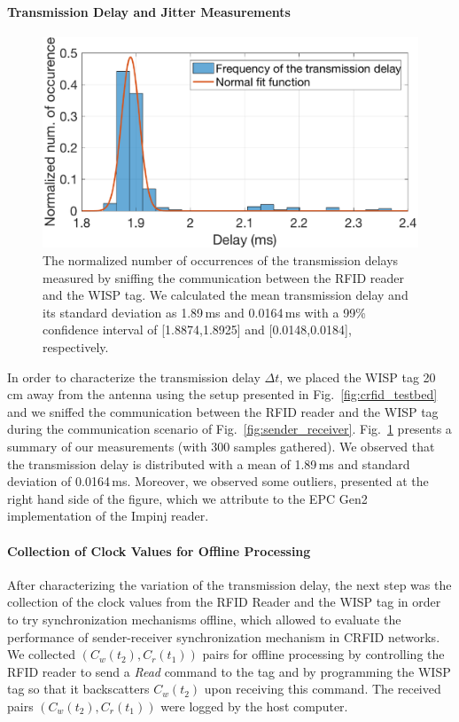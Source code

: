 \documentclass[journal,draftcls,onecolumn,12pt,twoside]{IEEEtranTCOM}
\begin{document}
\paragraph{Transmission Delay and Jitter Measurements}

\begin{figure}
\centering
\includegraphics[scale=0.35]{figures/sender_receiver_uncertainty.eps}
\caption{\label{fig:transmission_delay} The normalized number of occurrences of the transmission delays measured by sniffing the communication between the RFID reader and the WISP tag. We calculated the mean transmission delay and its standard deviation as 1.89\,ms and 0.0164\,ms with a 99\% confidence interval of [1.8874,1.8925] and [0.0148,0.0184], respectively.}
\end{figure}

In order to characterize the transmission delay $\Delta t$, we placed the WISP tag 20 cm away from the antenna using the setup presented in Fig.~\ref{fig:crfid_testbed} and we sniffed the communication between the RFID reader and the WISP tag during the communication scenario of Fig.~\ref{fig:sender_receiver}. Fig.~\ref{fig:transmission_delay} presents a summary of our measurements (with 300 samples gathered). We observed that the transmission delay is distributed with a mean of 1.89\,ms and standard deviation of 0.0164\,ms. Moreover, we observed some outliers, presented at the right hand side of the figure, which we attribute to the EPC Gen2 implementation of the Impinj reader. 

\paragraph{Collection of Clock Values for Offline Processing}

After characterizing the variation of the transmission delay, the next step was the collection of the clock values from the RFID Reader and the WISP tag in order to try synchronization mechanisms offline, which allowed to evaluate the performance of sender-receiver synchronization mechanism in CRFID networks. We collected $(C_w(t_2),C_r(t_1))$ pairs for offline processing by controlling the RFID reader to send a \emph{Read} command to the tag and by programming the WISP tag so that it backscatters $C_w(t_2)$ upon receiving this command. The received pairs $(C_w(t_2),C_r(t_1))$ were logged by the host computer. 
\end{document}
